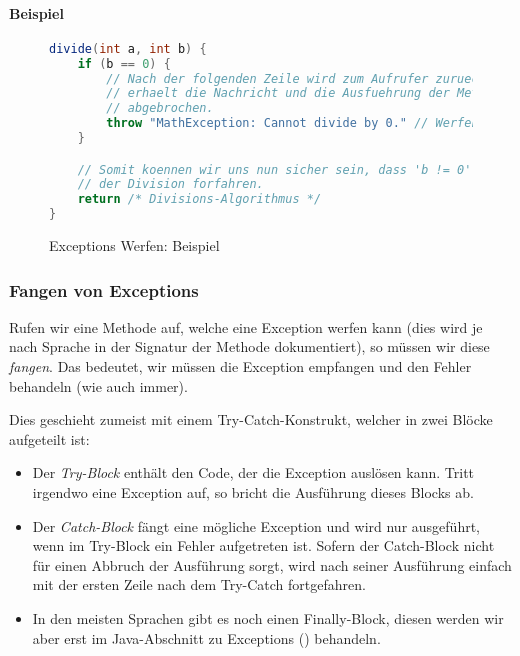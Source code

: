 		\paragraph{Beispiel}
			\begin{figure}[H]
				\centering
				\begin{lstlisting}[language = Java, style = base]
divide(int a, int b) {
	if (b == 0) {
		// Nach der folgenden Zeile wird zum Aufrufer zurueck gekehrt, dieser
		// erhaelt die Nachricht und die Ausfuehrung der Methode wird
		// abgebrochen.
		throw "MathException: Cannot divide by 0." // Werfen der Exception.
	}

	// Somit koennen wir uns nun sicher sein, dass 'b != 0' gilt und einfach mit
	// der Division forfahren.
	return /* Divisions-Algorithmus */
}
				\end{lstlisting}
				\caption{Exceptions Werfen: Beispiel}
				\label{fig:throw_exceptions}
			\end{figure}
	
	\subsubsection{Fangen von Exceptions}
		Rufen wir eine Methode auf, welche eine Exception werfen kann (dies wird je nach Sprache in der Signatur der Methode dokumentiert), so müssen wir diese \textit{fangen}. Das bedeutet, wir müssen die Exception empfangen und den Fehler behandeln (wie auch immer).
		
		Dies geschieht zumeist mit einem Try-Catch-Konstrukt, welcher in zwei Blöcke aufgeteilt ist:
		\begin{itemize}
			\item Der \textit{Try-Block} enthält den Code, der die Exception auslösen kann. Tritt irgendwo eine Exception auf, so bricht die Ausführung dieses Blocks ab.
			\item Der \textit{Catch-Block} fängt eine mögliche Exception und wird nur ausgeführt, wenn im Try-Block ein Fehler aufgetreten ist. Sofern der Catch-Block nicht für einen Abbruch der Ausführung sorgt, wird nach seiner Ausführung einfach mit der ersten Zeile nach dem Try-Catch fortgefahren.
			\item In den meisten Sprachen gibt es noch einen Finally-Block, diesen werden wir aber erst im Java-Abschnitt zu Exceptions () behandeln.
		\end{itemize}
		
